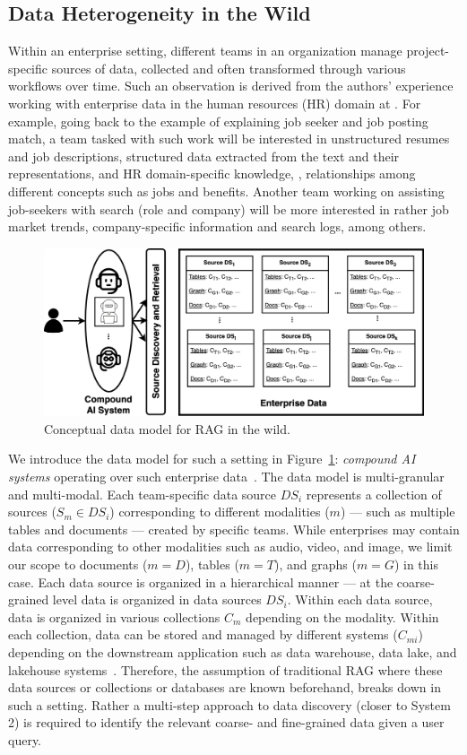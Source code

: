 \subsection{Data Heterogeneity in the Wild}
 Within an enterprise setting, different teams in an organization manage project-specific sources of data, collected and often transformed through various workflows over time. Such an observation is derived from the authors' experience working with enterprise data in the human resources (HR) domain at \company. 
For example, going back to the example of explaining job seeker and job posting match, a team tasked with such work will be interested in unstructured resumes and job descriptions, structured data extracted from the text and their representations, and HR domain-specific knowledge, \ie, relationships among different concepts such as jobs and benefits. Another team working on assisting job-seekers with search (\eg role and company) will be more interested in rather job market trends, company-specific information and search logs, among others. 

\begin{figure}[!htb] 
  \centering
  \includegraphics[width=0.65\linewidth]{submissions/Estevam2024/figures/mmd-lake.drawio.png}
  \caption{Conceptual data model for RAG in the wild.}
  \label{fig:cas_enterprise} 
\end{figure}

We introduce the data model for such a setting in Figure~\ref{fig:cas_enterprise}: \emph{compound AI systems} operating over such enterprise data~\cite{feng2024cmdbench}. The data model is multi-granular and multi-modal. Each team-specific data source $DS_i$ represents a collection of sources ($S_m \in DS_i$) corresponding to different modalities ($m$)  --- such as multiple tables and documents --- created by specific teams. While enterprises may contain data corresponding to other modalities such as audio, video, and image, we limit our scope to documents ($m=D$), tables ($m=T$), and graphs ($m=G$) in this case. Each data source is organized in a hierarchical manner --- at the coarse-grained level data is organized in data sources $DS_i$. Within each data source, data is organized in various collections $C_m$ depending on the modality. Within each collection, data can be stored and managed by different systems ($C_{mi}$) depending on the downstream application such as data warehouse, data lake, and lakehouse systems~\cite{DBLP:journals/bdcc/NambiarM22,armbrust2021lakehouse}. Therefore, the assumption of traditional RAG where these data sources or collections or databases are known beforehand, breaks down in such a setting. Rather a multi-step approach to data discovery (closer to System 2) is required to identify the relevant coarse- and fine-grained data given a user query.

